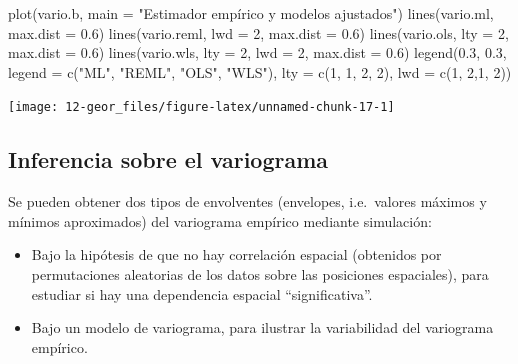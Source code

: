 \documentclass[
  spanish,
]{book}
\newenvironment{Shaded}{\begin{snugshade}}{\end{snugshade}}
\newcommand{\AttributeTok}[1]{\textcolor[rgb]{0.77,0.63,0.00}{#1}}
\newcommand{\DecValTok}[1]{\textcolor[rgb]{0.00,0.00,0.81}{#1}}
\newcommand{\FloatTok}[1]{\textcolor[rgb]{0.00,0.00,0.81}{#1}}
\newcommand{\FunctionTok}[1]{\textcolor[rgb]{0.00,0.00,0.00}{#1}}
\newcommand{\NormalTok}[1]{#1}
\newcommand{\StringTok}[1]{\textcolor[rgb]{0.31,0.60,0.02}{#1}}
\theoremstyle{break}
\begin{document}
\begin{Shaded}
\begin{Highlighting}[]
\FunctionTok{plot}\NormalTok{(vario.b, }\AttributeTok{main =} \StringTok{"Estimador empírico y modelos ajustados"}\NormalTok{)}
\FunctionTok{lines}\NormalTok{(vario.ml, }\AttributeTok{max.dist =} \FloatTok{0.6}\NormalTok{)}
\FunctionTok{lines}\NormalTok{(vario.reml, }\AttributeTok{lwd =} \DecValTok{2}\NormalTok{, }\AttributeTok{max.dist =} \FloatTok{0.6}\NormalTok{)}
\FunctionTok{lines}\NormalTok{(vario.ols, }\AttributeTok{lty =} \DecValTok{2}\NormalTok{, }\AttributeTok{max.dist =} \FloatTok{0.6}\NormalTok{)}
\FunctionTok{lines}\NormalTok{(vario.wls, }\AttributeTok{lty =} \DecValTok{2}\NormalTok{, }\AttributeTok{lwd =} \DecValTok{2}\NormalTok{, }\AttributeTok{max.dist =} \FloatTok{0.6}\NormalTok{)}
\FunctionTok{legend}\NormalTok{(}\FloatTok{0.3}\NormalTok{, }\FloatTok{0.3}\NormalTok{, }\AttributeTok{legend =} \FunctionTok{c}\NormalTok{(}\StringTok{"ML"}\NormalTok{, }\StringTok{"REML"}\NormalTok{, }\StringTok{"OLS"}\NormalTok{, }\StringTok{"WLS"}\NormalTok{), }\AttributeTok{lty =} \FunctionTok{c}\NormalTok{(}\DecValTok{1}\NormalTok{, }\DecValTok{1}\NormalTok{, }\DecValTok{2}\NormalTok{, }\DecValTok{2}\NormalTok{), }\AttributeTok{lwd =} \FunctionTok{c}\NormalTok{(}\DecValTok{1}\NormalTok{, }\DecValTok{2}\NormalTok{,}\DecValTok{1}\NormalTok{, }\DecValTok{2}\NormalTok{)) }
\end{Highlighting}
\end{Shaded}

\begin{center}\texttt{[image: 12-geor\_files/figure-latex/unnamed-chunk-17-1]} \end{center}

\hypertarget{inferencia-sobre-el-variograma}{%
\subsection{Inferencia sobre el variograma}\label{inferencia-sobre-el-variograma}}

Se pueden obtener dos tipos de envolventes (envelopes, i.e.~valores
máximos y mínimos aproximados) del variograma empírico mediante
simulación:

\begin{itemize}
\item
  Bajo la hipótesis de que no hay correlación espacial (obtenidos por
  permutaciones aleatorias de los datos sobre las posiciones
  espaciales), para estudiar si hay una dependencia
  espacial ``significativa''.
\item
  Bajo un modelo de variograma, para ilustrar la variabilidad del
  variograma empírico.
\end{itemize}
\end{document}
